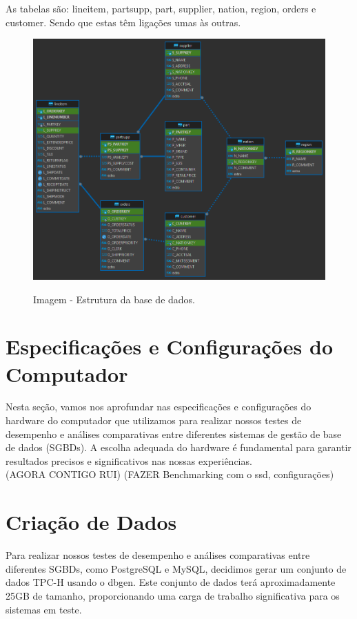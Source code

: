 \documentclass{article}
\begin{document}
As tabelas são: lineitem, partsupp, part, supplier, nation, region, orders e customer. Sendo que estas têm ligações umas às outras.
\begin{figure}[H]
  \centering
  \includegraphics[width=\textwidth]{Graphs/tpchassignment.png}\\
  \caption{Imagem - Estrutura da base de dados.}
  \label{fig:row_import_time}
\end{figure}

\clearpage


\section{Especificações e Configurações do Computador}

\quad Nesta seção, vamos nos aprofundar nas especificações e configurações do hardware do computador que utilizamos para realizar nossos testes de desempenho e análises comparativas entre diferentes sistemas de gestão de base de dados (SGBDs). A escolha adequada do hardware é fundamental para garantir resultados precisos e significativos nas nossas experiências.\\

(AGORA CONTIGO RUI) (FAZER Benchmarking com o ssd, configurações)


\section{Criação de Dados}

\quad Para realizar nossos testes de desempenho e análises comparativas entre diferentes SGBDs, como PostgreSQL e MySQL, decidimos gerar um conjunto de dados TPC-H usando o dbgen. Este conjunto de dados terá aproximadamente 25GB de tamanho, proporcionando uma carga de trabalho significativa para os sistemas em teste.\\
\end{document}
